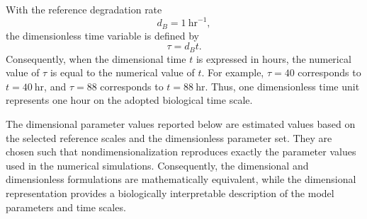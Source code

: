 \documentclass[11pt]{article}
\begin{document}
With the reference degradation rate
\[
d_B=1~\mathrm{hr}^{-1},
\]
the dimensionless time variable is defined by
\[
\tau=d_Bt.
\]
Consequently, when the dimensional time \(t\) is expressed in hours, the numerical
value of \(\tau\) is equal to the numerical value of \(t\). For example,
\(\tau=40\) corresponds to \(t=40~\mathrm{hr}\), and \(\tau=88\) corresponds to
\(t=88~\mathrm{hr}\). Thus, one dimensionless time unit represents one hour on
the adopted biological time scale.

The dimensional parameter values reported below are estimated values based on
the selected reference scales and the dimensionless parameter set. They are
chosen such that nondimensionalization reproduces exactly the parameter values
used in the numerical simulations. Consequently, the dimensional and
dimensionless formulations are mathematically equivalent, while the dimensional
representation provides a biologically interpretable description of the model
parameters and time scales.
\end{document}
